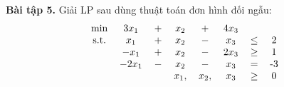 \documentclass[12pt]{article}
\begin{document}
    \textbf{Bài tập 5.} Giải LP sau dùng thuật toán đơn hình đối ngẫu:
    \begin{align*}
        \begin{tabular}{cccccccc}
            \text{min} & $3x_1$ & $+$ & $x_2$ & $+$ & $4x_3$\\
            \text{s.t.} & $x_1$ & $+$ & $x_2$ & $-$ & $x_3$ & $\leq$ & 2 \\
            & $-x_1$ & $+$ & $x_2$ & $-$ & $2x_3$ & $\geq$ & 1 \\
            & $-2x_1$ & $-$ & $x_2$ & $-$ & $x_3$ & $=$ & -3 \\
            & & & $x_1,$ & $x_2,$ & $x_3$ & $\geq$ & 0
        \end{tabular}
    \end{align*}
\end{document}
